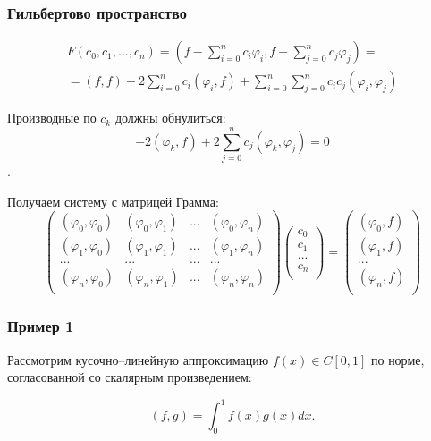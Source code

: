 \documentclass[10pt]{beamer}
\begin{document}
\begin{frame}[fragile]
\frametitle{Гильбертово пространство}

\begin{multline*}
F(c_0, c_1, ..., c_n) = (f - \sum_{i=0}^{n} c_i \varphi_i, f - \sum_{j=0}^{n} c_j \varphi_j) = \\
= (f, f) - 2 \sum_{i=0}^{n} c_i (\varphi_i, f) + \sum_{i=0}^{n} \sum_{j=0}^{n} c_i c_j (\varphi_i, \varphi_j)
\end{multline*}

Производные по $c_k$ должны обнулиться:
$$ - 2 (\varphi_k, f) + 2 \sum_{j=0}^{n} c_j (\varphi_k, \varphi_j) = 0$$.

Получаем систему с матрицей Грамма:
$$
\begin{pmatrix}
(\varphi_0, \varphi_0) & (\varphi_0, \varphi_1) & ... & (\varphi_0, \varphi_n) \\
(\varphi_1, \varphi_0) & (\varphi_1, \varphi_1) & ... & (\varphi_1, \varphi_n) \\
...						& ...					  & ... & ...					  \\
(\varphi_n, \varphi_0) & (\varphi_n, \varphi_1) & ... & (\varphi_n, \varphi_n) \\
\end{pmatrix}
\begin{pmatrix}
c_0 \\
c_1 \\
... \\
c_n \\
\end{pmatrix}
=
\begin{pmatrix}
(\varphi_0, f) \\
(\varphi_1, f) \\
... \\
(\varphi_n, f) \\
\end{pmatrix}
$$


\end{frame}




\begin{frame}[fragile]
\frametitle{Пример 1}

Рассмотрим кусочно--линейную аппроксимацию $f(x) \in C[0, 1]$ по норме, согласованной со скалярным произведением:

$$(f, g) = \int_{0}^{1} f(x) g(x) dx .$$
\end{frame}
\end{document}
